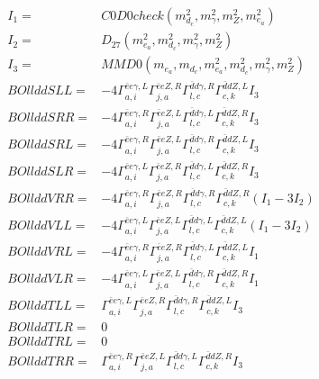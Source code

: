 \documentclass[A4,landscape]{article}
\begin{document}
\begin{align} 
I_1 = & C0D0check(m^2_{d_{{c}}}, m^2_{\gamma}, m^2_{Z}, m^2_{e_{{a}}}) \\ 
I_2 = & D_{27}(m^2_{e_{{a}}}, m^2_{d_{{c}}}, m^2_{\gamma}, m^2_{Z}) \\ 
I_3 = & MMD0(m_{e_{{a}}}, m_{d_{{c}}}, m^2_{e_{{a}}}, m^2_{d_{{c}}}, m^2_{\gamma}, m^2_{Z}) \\ 
  BOllddSLL= & -4  \Gamma^{\bar{e}e \gamma ,L}_{a, i} \Gamma^{\bar{e}e Z ,R}_{j, a} \Gamma^{\bar{d}d \gamma ,R}_{l, c} \Gamma^{\bar{d}d Z ,L}_{c, k} I_3 \\ 
  BOllddSRR= & -4  \Gamma^{\bar{e}e \gamma ,R}_{a, i} \Gamma^{\bar{e}e Z ,L}_{j, a} \Gamma^{\bar{d}d \gamma ,L}_{l, c} \Gamma^{\bar{d}d Z ,R}_{c, k} I_3 \\ 
  BOllddSRL= & -4  \Gamma^{\bar{e}e \gamma ,R}_{a, i} \Gamma^{\bar{e}e Z ,L}_{j, a} \Gamma^{\bar{d}d \gamma ,R}_{l, c} \Gamma^{\bar{d}d Z ,L}_{c, k} I_3 \\ 
  BOllddSLR= & -4  \Gamma^{\bar{e}e \gamma ,L}_{a, i} \Gamma^{\bar{e}e Z ,R}_{j, a} \Gamma^{\bar{d}d \gamma ,L}_{l, c} \Gamma^{\bar{d}d Z ,R}_{c, k} I_3 \\ 
  BOllddVRR= & -4  \Gamma^{\bar{e}e \gamma ,R}_{a, i} \Gamma^{\bar{e}e Z ,R}_{j, a} \Gamma^{\bar{d}d \gamma ,R}_{l, c} \Gamma^{\bar{d}d Z ,R}_{c, k} (I_1 - 3 I_2) \\ 
  BOllddVLL= & -4  \Gamma^{\bar{e}e \gamma ,L}_{a, i} \Gamma^{\bar{e}e Z ,L}_{j, a} \Gamma^{\bar{d}d \gamma ,L}_{l, c} \Gamma^{\bar{d}d Z ,L}_{c, k} (I_1 - 3 I_2) \\ 
  BOllddVRL= & -4  \Gamma^{\bar{e}e \gamma ,R}_{a, i} \Gamma^{\bar{e}e Z ,R}_{j, a} \Gamma^{\bar{d}d \gamma ,L}_{l, c} \Gamma^{\bar{d}d Z ,L}_{c, k} I_1 \\ 
  BOllddVLR= & -4  \Gamma^{\bar{e}e \gamma ,L}_{a, i} \Gamma^{\bar{e}e Z ,L}_{j, a} \Gamma^{\bar{d}d \gamma ,R}_{l, c} \Gamma^{\bar{d}d Z ,R}_{c, k} I_1 \\ 
  BOllddTLL= &  \Gamma^{\bar{e}e \gamma ,L}_{a, i} \Gamma^{\bar{e}e Z ,R}_{j, a} \Gamma^{\bar{d}d \gamma ,R}_{l, c} \Gamma^{\bar{d}d Z ,L}_{c, k} I_3 \\ 
  BOllddTLR= & 0 \\ 
  BOllddTRL= & 0 \\ 
  BOllddTRR= &  \Gamma^{\bar{e}e \gamma ,R}_{a, i} \Gamma^{\bar{e}e Z ,L}_{j, a} \Gamma^{\bar{d}d \gamma ,L}_{l, c} \Gamma^{\bar{d}d Z ,R}_{c, k} I_3 \\ 
\end{align} 
\end{document}
